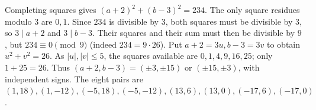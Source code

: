 Completing squares gives $(a+2)^2+(b-3)^2=234$. The only square residues modulo $3$ are $0,1$. Since $234$ is divisible by $3$, both squares must be divisible by $3$, so $3\mid a+2$ and $3\mid b-3$. Their squares and their sum must then be divisible by $9$, but $234\equiv 0\pmod 9$ (indeed $234=9\cdot 26$). Put $a+2=3u,b-3=3v$ to obtain $u^2+v^2=26$. As $|u|,|v|\le 5$, the squares available are $0,1,4,9,16,25$; only $1+25=26$. Thus $(a+2,b-3)=(\pm 3,\pm 15)$ or $(\pm 15,\pm 3)$, with independent signs. The eight pairs are $\boxed{(1,18),(1,-12),(-5,18),(-5,-12),(13,6),(13,0),(-17,6),(-17,0)}$.
